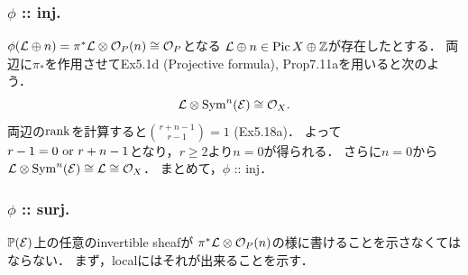 \documentclass[a4paper]{jsarticle}
\newcommand{\Pic}{\operatorname{Pic}}
\newcommand{\Sym}{\operatorname{Sym}}
\newcommand{\pbundle}{\mathbb{P}}
\begin{document}
    \subsubsection{$\phi$ :: inj.}
    $\phi(\mathcal{L} \oplus n)=\pi^* \mathcal{L} \otimes \mathcal{O}_P(n) \cong \mathcal{O}_P$となる
    $\shL \oplus n \in \Pic X \oplus \Z$が存在したとする．
    両辺に$\pi_*$を作用させてEx5.1d (Projective formula), Prop7.11aを用いると次のよう．
    \[ \shL \otimes \Sym^n(\shE) \iso \shO_X. \]
    両辺の$\operatorname{rank}$を計算すると$\binom{r+n-1}{r-1}=1$ (Ex5.18a)．
    よって$r-1=0 \text{ or } r+n-1$となり，$r \geq 2$より$n=0$が得られる．
    さらに$n=0$から$\shL \otimes \Sym^n(\shE) \iso \shL\iso \shO_X$．
    まとめて，$\phi$ :: inj．

    \subsubsection{$\phi$ :: surj.}
    $\pbundle(\shE)$上の任意のinvertible sheafが
    $\pi^* \mathcal{L} \otimes \mathcal{O}_P(n)$の様に書けることを示さなくてはならない．
    まず，localにはそれが出来ることを示す．
\end{document}
